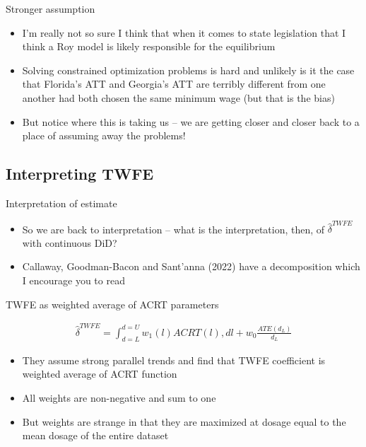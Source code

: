 \documentclass{beamer}
\begin{document}
\begin{frame}{Stronger assumption}

\begin{itemize}

\item I'm really not so sure I think that when it comes to state legislation that I think a Roy model is likely responsible for the equilibrium
\item Solving constrained optimization problems is hard and unlikely is it the case that Florida's ATT and Georgia's ATT are terribly different from one another had both chosen the same minimum wage (but that is the bias)
\item But notice where this is taking us -- we are getting closer and closer back to a place of assuming away the problems!

\end{itemize}

\end{frame}

\subsection{Interpreting TWFE}

\begin{frame}{Interpretation of estimate}

\begin{itemize}

\item So we are back to interpretation -- what is the interpretation, then, of $\widehat{\delta}^{TWFE}$ with continuous DiD?
\item Callaway, Goodman-Bacon and Sant'anna (2022) have a decomposition which I encourage you to read
\end{itemize}


\end{frame}

\begin{frame}{TWFE as weighted average of ACRT parameters}

\begin{eqnarray*}
\widehat{\delta}^{TWFE} = \int_{d=L}^{d=U} w_1(l) ACRT(l) , dl + w_0 \frac{ATE(d_L)}{d_L}
\end{eqnarray*}

\begin{itemize}
\item They assume strong parallel trends and find that TWFE coefficient is weighted average of ACRT function
\item All weights are non-negative and sum to one
\item But weights are strange in that they are maximized at dosage equal to the mean dosage of the entire dataset
\end{itemize}

\end{frame}
\end{document}
